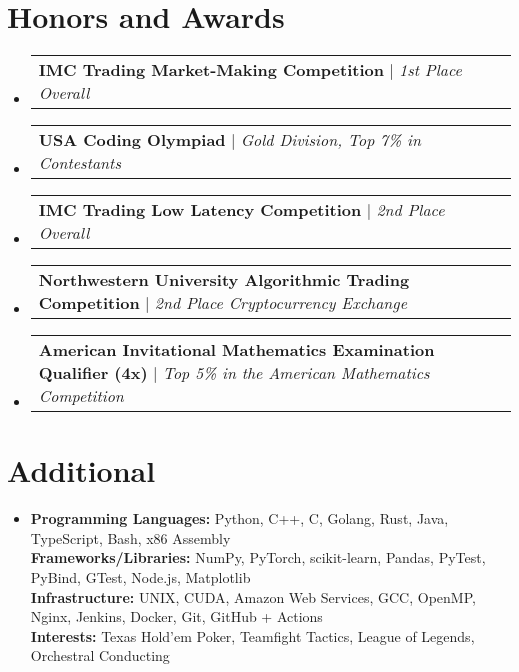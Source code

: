 \documentclass[letterpaper,11pt]{article}
\makeatletter
\newcommand{\resumeAwardHeading}[2]{
    \vspace{-2pt}\item
        \begin{tabular*}{\textwidth}[t]{l@{\extracolsep{\fill}}r}
          \textbf{#1} $|$ \textit{#2} \\
        \end{tabular*}\vspace{-8.5pt}
}
\newcommand{\resumeSubHeadingListStart}{\begin{itemize}[leftmargin=0in, rightmargin=0in, label={}]}
\newcommand{\resumeSubHeadingListEnd}{\end{itemize}}
\makeatother
\begin{document}
\section*{Honors and Awards}
    \resumeSubHeadingListStart

      \resumeAwardHeading   
        {IMC Trading Market-Making Competition}{1st Place Overall}

      \resumeAwardHeading
        {USA Coding Olympiad}{Gold Division, Top 7\% in Contestants}

      \resumeAwardHeading
        {IMC Trading Low Latency Competition}{2nd Place Overall}

      \resumeAwardHeading
        {Northwestern University Algorithmic Trading Competition}{2nd Place Cryptocurrency Exchange}

      \resumeAwardHeading
        {American Invitational Mathematics Examination Qualifier (4x)}{Top 5\% in the American Mathematics Competition}
      
      \vspace{-4pt}

    \resumeSubHeadingListEnd
%

\section*{Additional}
 \begin{itemize}[leftmargin=0in, rightmargin=0in, label={}]
    \item{
     \textbf{Programming Languages:} Python, C++, C, Golang, Rust, Java, TypeScript, Bash, x86 Assembly \\
     \textbf{Frameworks/Libraries:} NumPy, PyTorch, scikit-learn, Pandas, PyTest, PyBind, GTest, Node.js, Matplotlib\\
     \textbf{Infrastructure:} UNIX, CUDA, Amazon Web Services, GCC, OpenMP, Nginx, Jenkins, Docker, Git, GitHub + Actions \\ 
     \textbf{Interests:} Texas Hold'em Poker, Teamfight Tactics, League of Legends, Orchestral Conducting
    }
 \end{itemize}
%
\end{document}
